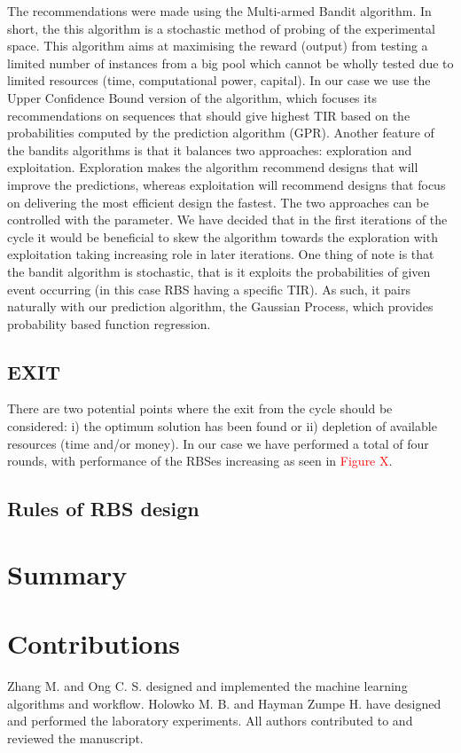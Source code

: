 \documentclass{article}
\begin{document}
The recommendations were made using the Multi-armed Bandit algorithm.
In short, the this algorithm is a stochastic method of probing of the experimental space. 
This algorithm aims at maximising the reward (output) from testing a limited number of instances from a big pool which cannot be wholly tested due to limited resources (time, computational power, capital). 
In our case we use the Upper Confidence Bound version of the algorithm, which focuses its recommendations on sequences that should give highest TIR based on the probabilities computed by the prediction algorithm (GPR). 
Another feature of the bandits algorithms is that it balances two approaches: exploration and exploitation. 
Exploration makes the algorithm recommend designs that will improve the predictions, whereas exploitation will recommend designs that focus on delivering the most efficient design the fastest. 
The two approaches can be controlled with the \textbeta\enspace parameter. 
We have decided that in the first iterations of the cycle it would be beneficial to skew the algorithm towards the exploration with exploitation taking increasing role in later iterations. 
One thing of note is that the bandit algorithm is stochastic, that is it exploits the probabilities of given event occurring (in this case RBS having a specific TIR). 
As such, it pairs naturally with our prediction algorithm, the Gaussian Process, which provides probability based function regression.
\\

\subsection{EXIT}
There are two potential points where the exit from the cycle should be considered: i) the optimum solution has been found or ii) depletion of available resources (time and/or money). In our case we have performed a total of four rounds, with performance of the RBSes increasing as seen in \textcolor{red}{Figure X}.\\

\subsection{Rules of RBS design}



\section{Summary}

\section{Contributions}
Zhang M. and Ong C. S. designed and implemented the machine learning algorithms and workflow. Holowko M. B. and Hayman Zumpe H. have designed and performed the laboratory experiments. All authors contributed to and reviewed the manuscript.


\newpage

\printbibliography

\clearpage

\appendix

\end{document}
